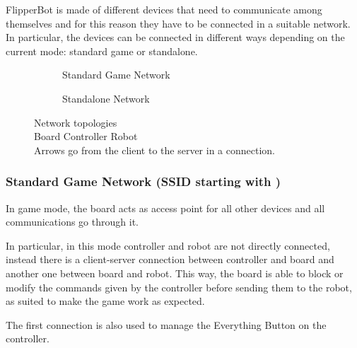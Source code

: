 
FlipperBot is made of different devices that need to communicate
among themselves and for this reason they have to be connected in a
suitable network. In particular, the devices can be connected in
different ways depending on the current mode: standard game or
standalone.

\begin{figure}[htbp]
  \begin{subfigure}[c]{0.5\textwidth}
    \resizebox{\textwidth}{!}{}
  \end{subfigure}
  \begin{subfigure}[c]{0.5\textwidth}
    \resizebox{\textwidth}{!}{}
  \end{subfigure}
  \begin{subfigure}[t]{0.5\textwidth}
    \caption{Standard Game Network}
    \label{fig:gamenet}
  \end{subfigure}
  \begin{subfigure}[t]{0.5\textwidth}
    \caption{Standalone Network}
    \label{fig:robotnet}
  \end{subfigure}
  \captionsetup{singlelinecheck=off}
  \caption[Network topologies]{%
  \centering
  Network topologies
  \\
  \small
  \resizebox{1em}{!}{\usebox{\tikzboard}} Board\quad
  \resizebox{1em}{!}{\usebox{\tikzcontr}} Controller\quad
  \resizebox{1em}{!}{\usebox{\tikzrobot}} Robot
  \\
  Arrows go from the client to the server in a connection.
  }
  \label{fig:network}
\end{figure}

\subsubsection{Standard Game Network (SSID starting with
  )}
  In game mode, the board acts as access point for all other devices
  and all communications go through it.

  In particular, in this mode controller and robot are not directly
  connected, instead there is a client-server connection between
  controller and board and another one between board and robot. This
  way, the board is able to block or modify the commands given by
  the controller before sending them to the robot, as suited to make
  the game work as expected.

  The first connection is also used to manage the Everything Button
  on the controller.


